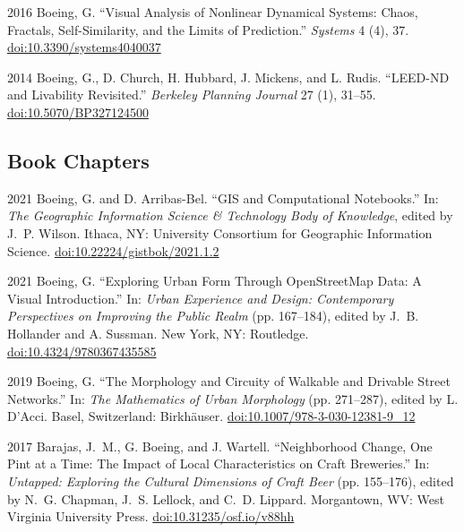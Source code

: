 \documentclass[12pt,letterpaper]{report}
\begin{document}
\begin{tablist}
        \item[2016] \tab Boeing, G. \enquote{Visual Analysis of Nonlinear Dynamical Systems: Chaos, Fractals, Self-Similarity, and the Limits of Prediction.} \textit{Systems} 4 (4), 37. \href{https://doi.org/10.3390/systems4040037}{doi:10.3390/systems4040037}

        \item[2014] \tab Boeing, G., D. Church, H. Hubbard, J. Mickens, and L. Rudis. \enquote{LEED-ND and Livability Revisited.} \textit{Berkeley Planning Journal} 27 (1), 31--55. \href{https://doi.org/10.5070/BP327124500}{doi:10.5070/BP327124500}

    \end{tablist}



    \subsection*{Book Chapters}

    \begin{tablist}

        \item[2021] \tab Boeing, G. and D. Arribas-Bel. \enquote{GIS and Computational Notebooks.} In: \textit{The Geographic Information Science \& Technology Body of Knowledge}, edited by J.~P. Wilson. Ithaca, NY: University Consortium for Geographic Information Science. \href{https://doi.org/10.22224/gistbok/2021.1.2}{doi:10.22224/gistbok/2021.1.2}

        \item[2021] \tab Boeing, G. \enquote{Exploring Urban Form Through OpenStreetMap Data: A Visual Introduction.} In: \textit{Urban Experience and Design: Contemporary Perspectives on Improving the Public Realm} (pp. 167--184), edited by J.~B. Hollander and A. Sussman. New York, NY: Routledge. \href{https://doi.org/10.4324/9780367435585}{doi:10.4324/9780367435585}

        \item[2019] \tab Boeing, G. \enquote{The Morphology and Circuity of Walkable and Drivable Street Networks.} In: \textit{The Mathematics of Urban Morphology} (pp. 271--287), edited by L. D'Acci. Basel, Switzerland: Birkhäuser. \href{https://doi.org/10.1007/978-3-030-12381-9_12}{doi:10.1007/978-3-030-12381-9\_12}

        \item[2017] \tab Barajas, J.~M., G. Boeing, and J. Wartell. \enquote{Neighborhood Change, One Pint at a Time: The Impact of Local Characteristics on Craft Breweries.} In: \textit{Untapped: Exploring the Cultural Dimensions of Craft Beer} (pp. 155--176), edited by N.~G. Chapman, J.~S. Lellock, and C.~D. Lippard. Morgantown, WV: West Virginia University Press. \href{https://doi.org/10.31235/osf.io/v88hh}{doi:10.31235/osf.io/v88hh}

    \end{tablist}
\end{document}
